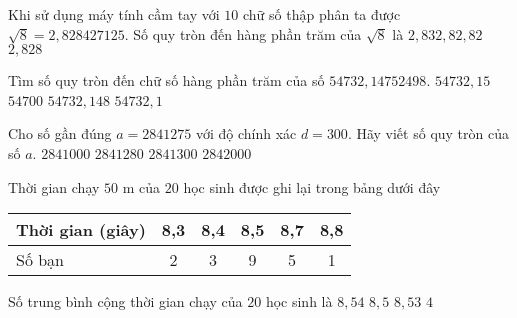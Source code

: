 \begin{ex}%
Khi sử dụng máy tính cầm tay với $10$ chữ số thập phân ta được $\sqrt{8}= 2{,}828427125$. Số quy tròn đến hàng phần trăm của $\sqrt{8}$ là
\choice
{\True $2{,}83$}{$2{,}8$}{$2{,}82$}{$2{,}828$}
\end{ex}

\begin{ex}%
Tìm số quy tròn đến chữ số hàng phần trăm của số $54732{,}14752498$.
	\choice
	{\True$54732{,}15$}
	{$54700$}
	{$54732{,}148$}
	{$54732{,}1$}	
\end{ex}

\begin{ex}%
Cho số gần đúng $a=2841275$ với độ chính xác $d=300$. Hãy viết số quy tròn của số $a$.
\choice
{\True $ 2841000$}
{$ 2841280$}
{$ 2841300$}
{ $ 2842000$}
\end{ex}


\begin{ex}%
	Thời gian chạy $ 50 $ m của $ 20 $ học sinh được ghi lại trong bảng dưới đây
	\begin{center}
		\begin{tabular}{|l|c|c|c|c|c|}
			\hline
			Thời gian (giây) & 8,3 & 8,4 & 8,5 & 8,7 & 8,8 \\
			\hline
			Số bạn & 2 & 3 & 9 & 5 & 1 \\
			\hline
		\end{tabular}
	\end{center}
	Số trung bình cộng thời gian chạy của $20$ học sinh là
	\choice
	{ $8{, }54$}
	{$8{, }5$}
	{\True $8{, }53$}
	{$4$}
\end{ex}

